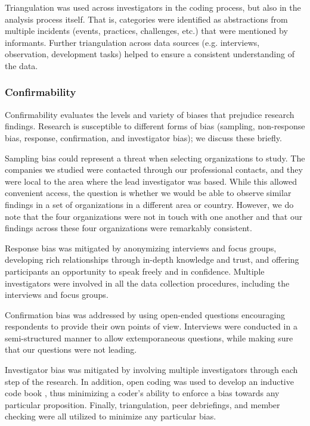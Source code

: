 \documentclass[smallextended]{svjour3}
\begin{document}
Triangulation was used across investigators in the coding process, but also in the analysis process itself. That is, categories were identified as abstractions from multiple incidents (events, practices, challenges, etc.) that were mentioned by informants. Further triangulation across data sources (e.g. interviews, observation, development tasks) helped to ensure a consistent understanding of the data. 


\subsubsection{Confirmability}

Confirmability evaluates the levels and variety of biases that prejudice research findings.
Research is susceptible to different forms of bias (sampling, non-response bias, response, confirmation, and investigator bias); we discuss these briefly.

{Sampling bias} could represent a threat when selecting organizations to study. The companies we studied were contacted through our professional contacts, and they were local to the area where the lead investigator was based. While this allowed convenient access, the question is whether we would be able to observe similar findings in a set of organizations in a different area or country. However, we do note that the four organizations were not in touch with one another and that our findings across these four organizations were remarkably consistent.



{Response bias} was mitigated by anonymizing interviews and focus groups, developing rich relationships through in-depth knowledge and trust, and offering participants an opportunity to speak freely and in confidence.
Multiple investigators were involved in all the data collection procedures, including the interviews and focus groups. 

{Confirmation bias} was addressed by using open-ended questions encouraging respondents to provide their own points of view. 
Interviews were conducted in a semi-structured manner to allow extemporaneous questions,  
while making sure that our questions were not leading.

{Investigator bias} was mitigated by involving multiple investigators through each step of the research.
In addition, open coding \citep{corbin1990grounded} was used to develop an inductive code book \citep{cruzes_recommended_2011}, thus minimizing a coder's ability to enforce a bias towards any particular proposition.
Finally, triangulation, peer debriefings, and member checking were all utilized to minimize any particular bias.
\end{document}
